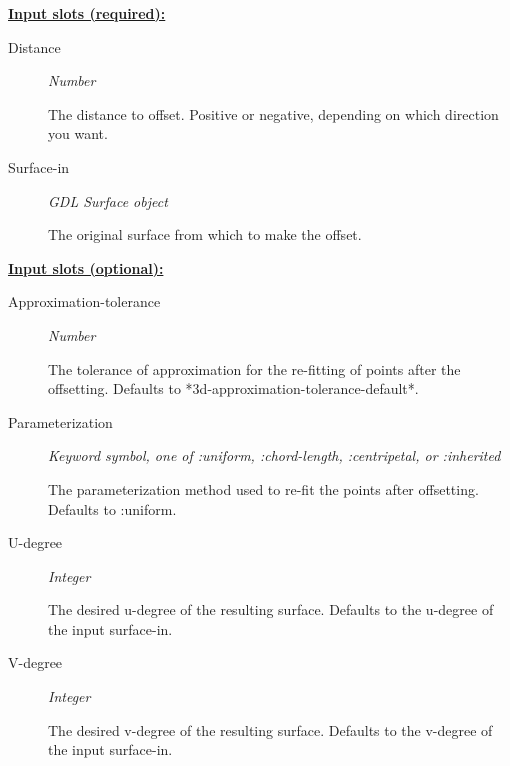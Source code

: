 \documentclass [11pt]{book}
\begin{document}
\begin{itemize}
\textbf{
\underline{Input slots (required):}}

\begin{description}

\item [Distance]
\emph{Number}

 The distance to offset. Positive or negative, depending on which direction you want.




\item [Surface-in]
\emph{GDL Surface object}

 The original surface from which to make the offset.




\end{description}






\textbf{
\underline{Input slots (optional):}}

\begin{description}

\item [Approximation-tolerance]
\emph{Number}

 The tolerance of approximation for the re-fitting of points after the offsetting.
Defaults to *3d-approximation-tolerance-default*.




\item [Parameterization]
\emph{Keyword symbol, one of :uniform, :chord-length, :centripetal, or :inherited}

 The parameterization
method used to re-fit the points after offsetting. Defaults to :uniform.




\item [U-degree]
\emph{Integer}

 The desired u-degree of the resulting surface. Defaults to the u-degree of the input surface-in.




\item [V-degree]
\emph{Integer}

 The desired v-degree of the resulting surface. Defaults to the v-degree of the input surface-in.





\end{description}
\end{itemize}
\end{document}
